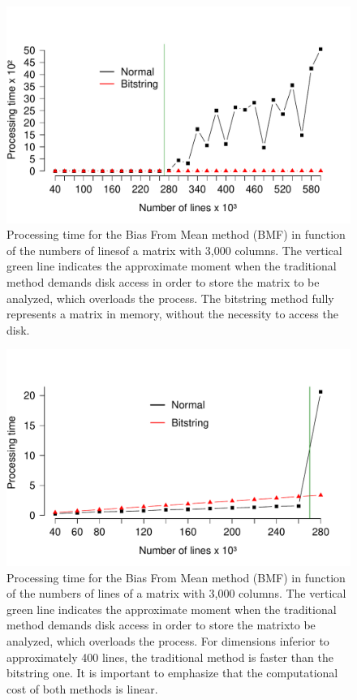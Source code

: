 \documentclass[10pt]{article}
\begin{document}
\begin{figure}[h]
  \centering
  \includegraphics[scale=0.6,clip]{fig42}
  \caption{Processing time for the Bias From Mean method (BMF) in function of 
the numbers of linesof a matrix 
  with 3,000 columns. The vertical green line indicates the approximate moment 
when the traditional method  
  demands  disk access in order to store the matrix to be analyzed, which  
overloads the process. The bitstring 
  method fully represents a matrix  in memory, without the necessity to access 
the  disk.}
  \label{fig42}
\end{figure}

\begin{figure}[h]
  \centering
  \includegraphics[scale=0.6,clip]{fig43}
  \caption{Processing time for the Bias From Mean method (BMF) in function of 
the  numbers of lines of a matrix 
  with 3,000 columns.  The vertical green line indicates the approximate moment 
when the traditional method  
  demands disk access in order to store the matrixto be analyzed, which  
overloads the process. For dimensions 
  inferior to approximately 400 lines, the traditional method is faster than the 
bitstring one. It is important 
  to emphasize that the computational cost of both methods is linear.}
  \label{fig43}
\end{figure}
\end{document}
